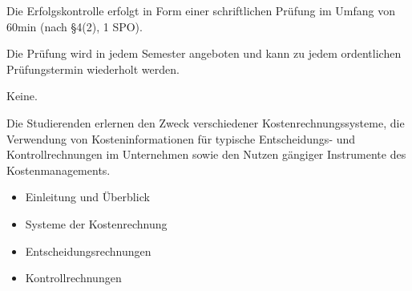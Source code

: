 \begin{course}

\setdoclanguagegerman
{}



\coursehead


\label{cour_6801.dp_997}


\begin{styleenv}
\begin{assessment}
Die Erfolgskontrolle erfolgt in Form einer schriftlichen Prüfung im Umfang von 60min (nach §4(2), 1 SPO).

 

Die Prüfung wird in jedem Semester angeboten und kann zu jedem ordentlichen Prüfungstermin wiederholt werden.


\end{assessment}

\begin{conditions}Keine.\end{conditions}


\end{styleenv}

\begin{learningoutcomes}
Die Studierenden erlernen den Zweck verschiedener Kostenrechnungssysteme,\newline
die Verwendung von Kosteninformationen für typische Entscheidungs- und\newline
Kontrollrechnungen im Unternehmen sowie den Nutzen gängiger Instrumente des\newline
Kostenmanagements.


\end{learningoutcomes}

\begin{content}
\begin{itemize}\item Einleitung und Überblick  \item Systeme der Kostenrechnung  \item Entscheidungsrechnungen  \item Kontrollrechnungen  \end{itemize}
\end{content}




\end{course}
